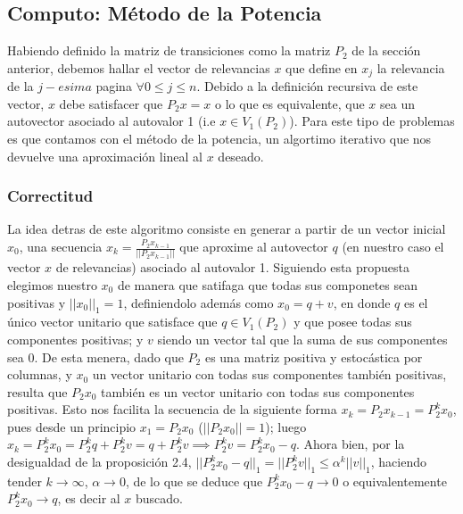 \subsection{Computo: Método de la Potencia}

 Habiendo definido la matriz de transiciones como la matriz $P_2$ de la sección anterior, debemos hallar el vector de relevancias $x$ que define en $x_j$ la relevancia de la $j-esima$ pagina $\forall 0 \leq j \leq n$. Debido a la definición recursiva de este vector, $x$ debe satisfacer que $P_2x=x$ o lo que es equivalente, que $x$ sea un autovector asociado al autovalor 1 (i.e $x \in V_1(P_2)$). Para este tipo de problemas es que contamos con el método de la potencia, un algortimo iterativo que nos devuelve una aproximación lineal al $x$ deseado. 

\iffalse
  Como ya hemos visto por las proposiciones anteriores, dado que $P_2$ es una matriz positiva y estocástica por columnas, la $dim(V_1(P_2))$ es 1 y su autovector asociado posee todas sus componentes de igual signo.   

\textbf{LO SIGUIENTE ES PARA MAURO. HACELO EN TE RO (SI ENTERO), NO SEAS PAJERO. QUIERO LA SECCION BIEN COMPLETA CON LOS PUNTOS OPCIONALES, SOLO TENES QUE HACER ESTO. IMAGINATE QUE YO ME MORFE ESCRIBIR TODO.}

La pregunta mas importante del trabajo, dado la matriz de transiciones $P$ que garantiza la existencia y unicidad del autovector de norma 1 asociado al autovalor 1, como lo computamos?
\fi

\subsubsection{Correctitud}


La idea detras de este algoritmo consiste en generar a partir de un vector inicial $x_0$, una secuencia $x_k = \frac{P_2x_{k-1}}{||P_2x_{k-1}||}$ que aproxime al autovector $q$ (en nuestro caso el vector $x$ de relevancias) asociado al autovalor 1. Siguiendo esta propuesta elegimos nuestro $x_0$ de manera que satifaga que todas sus componetes sean positivas y $||x_0||_1 = 1$, definiendolo además como $x_0 = q + v$, en donde $q$ es el único vector unitario que satisface que $q \in V_1(P_2)$ y que posee todas sus componentes positivas; y $v$ siendo un vector tal que la suma de sus componentes sea 0. De esta menera, dado que $P_2$ es una matriz positiva y estocástica por columnas, y $x_0$ un vector unitario con todas sus componentes también positivas, resulta que $P_2x_0$ también es un vector unitario con todas sus componentes positivas. Esto nos facilita la secuencia de la siguiente forma $x_k = P_2x_{k-1} = P_2^kx_0$, pues desde un principio $x_1 = P_2x_0$ ($||P_2x_0||=1$); luego $x_k = P_2^kx_0 = P_2^kq + P_2^kv = q + P_2^kv \implies P_2^kv = P_2^kx_0 - q$. Ahora bien, por la desigualdad de la proposición 2.4, $||P_2^kx_0 - q||_1 = ||P_2^kv||_1 \leq \alpha^k||v||_1$, haciendo tender $k\to\infty$, $\alpha\to 0$, de lo que se deduce que $P_2^kx_0 - q\to 0$ o equivalentemente $P_2^kx_0 \to q$, es decir al $x$ buscado. 

